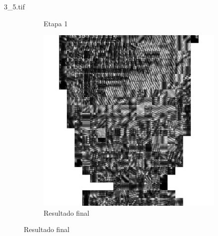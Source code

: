 \documentclass{beamer}
\begin{document}
\begin{frame}{3\_5.tif}
\begin{figure}
\begin{subfigure}[!ht]{0.32\textwidth}
                \caption{Etapa 1}
            \end{subfigure}
            \begin{subfigure}[!ht]{0.32\textwidth}
                \includegraphics[width=\columnwidth]{Fingerprints/3_5_final.jpg}
                \caption{Resultado final}
            \end{subfigure}
        \end{figure}
    \end{frame}
\end{document}
